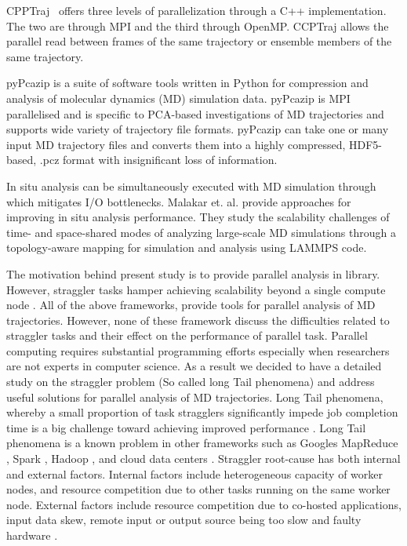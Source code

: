 CPPTraj~\cite{cpptraj-2013} offers three levels of parallelization through a C++ implementation. The two are through MPI and the third through OpenMP.
CCPTraj allows the parallel read between frames of the same trajectory or ensemble members of the same trajectory. 
 
pyPcazip \cite{pyPcazip} is a suite of software tools written in Python for compression and analysis of molecular dynamics (MD) simulation data. 
pyPcazip is MPI parallelised and is specific to PCA-based investigations of MD trajectories and supports wide variety of trajectory file formats.
pyPcazip can take one or many input MD trajectory files and converts them into a highly compressed, HDF5-based, .pcz format with insignificant loss of information.

In situ analysis can be simultaneously executed with MD simulation through which mitigates I/O bottlenecks.
Malakar et. al. \cite{Malakar-etal} provide approaches for improving in situ analysis performance. 
They study the scalability challenges of time- and space-shared modes of analyzing large-scale MD simulations through a topology-aware mapping for simulation and analysis using LAMMPS code.

The motivation behind present study is to provide parallel analysis in  library.
However, straggler tasks hamper achieving scalability beyond a single compute node \cite{Khoshlessan:2017ab}. 
All of the above frameworks, provide tools for parallel analysis of MD trajectories. 
However, none of these framework discuss the difficulties related to straggler tasks and their effect on the performance of parallel task.
Parallel computing requires substantial programming efforts especially when researchers are not experts in computer science.
As a result we decided to have a detailed study on the straggler problem (So called long Tail phenomena) and address useful solutions for parallel analysis of MD trajectories.
Long Tail phenomena, whereby a small proportion of task stragglers significantly impede job completion time is a big challenge toward achieving improved performance \cite{Garraghan2016}.
Long Tail phenomena is a known problem in other frameworks such as Google\textsc{}s MapReduce \cite{Dean2004}, Spark \cite{Kyong2017,Ousterhout2017,Gittens2016}, Hadoop \cite{Dean2004}, and cloud data centers \cite{Schmidt2016}. Straggler root-cause has both internal and external factors. 
Internal factors include heterogeneous capacity of worker nodes, and resource competition due to other tasks running on the same worker node. 
External factors include resource competition due to co-hosted applications, input data skew, remote input or output source being too slow and faulty hardware \cite{Chen2014}.

